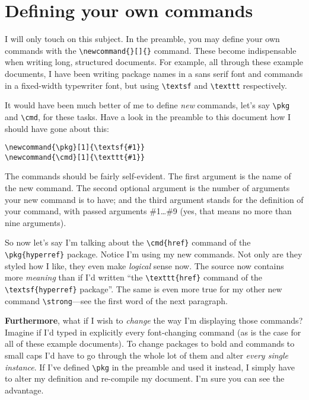 \documentclass[12pt,article]{memoir}
\newcommand{\pkg}[1]{\textsf{#1}}
\newcommand{\cmd}[1]{\texttt{#1}}
\newcommand{\strong}[1]{{\sffamily \bfseries #1}}
\begin{document}
\chapter*{Defining your own commands}

I will only touch on this subject. In the preamble, you may define your own commands with the \verb|\newcommand{}[]{}| command. These become indispensable when writing long, structured documents. For example, all through these example documents, I have been writing package names in a sans serif font and commands in a fixed-width typewriter font, but using \verb|\textsf| and \verb|\texttt| respectively.

It would have been much better of me to define \emph{new} commands, let's say \verb|\pkg| and \verb|\cmd|, for these tasks. Have a look in the preamble to this document how I should have gone about this:
%
\begin{verbatim}
\newcommand{\pkg}[1]{\textsf{#1}}
\newcommand{\cmd}[1]{\texttt{#1}}
\end{verbatim}

The commands should be fairly self-evident. The first argument is the name of the new command. The second optional argument is the number of arguments your new command is to have; and the third argument stands for the definition of your command, with passed arguments \#1\dots\#9 (yes, that means no more than nine arguments).

So now let's say I'm talking about the \verb|\cmd{href}| command of the \verb|\pkg{hyperref}| package. Notice I'm using my new commands. Not only are they styled how I like, they even make \emph{logical} sense now. The source now contains more \emph{meaning} than if I'd written ``the \verb|\texttt{href}| command of the \verb|\textsf{hyperref}| package''. The same is even more true for my other new command \verb"\strong"---see the first word of the next paragraph.

\strong{Furthermore}, what if I wish to \emph{change} the way I'm displaying those commands? Imagine if I'd typed in explicitly every font-changing command (as is the case for all of these example documents). To change packages to bold and commands to small caps I'd have to go through the whole lot of them and alter \emph{every single instance}. If I've defined \verb|\pkg| in the preamble and used it instead, I simply have to alter my definition and re-compile my document. I'm sure you can see the advantage.
\end{document}
